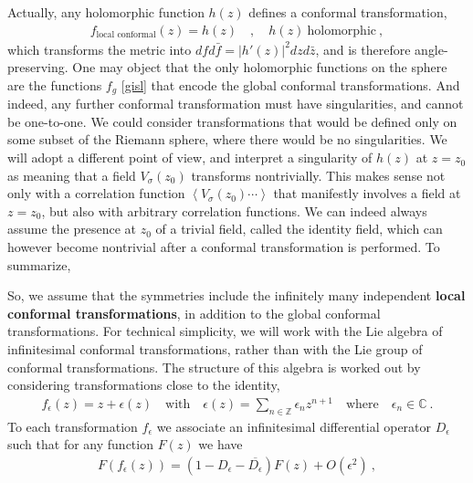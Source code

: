 \documentclass[12pt, a4paper, notitlepage, twoside]{report}
\numberwithin{equation}{section}
\theoremstyle{break}
\begin{document}
Actually, any holomorphic function $h(z)$ defines a conformal transformation,
\begin{align}
 f_\text{local conformal}(z) = h(z) \quad , \quad h(z)\ \text{holomorphic}\ , 
\label{flc}
\end{align}
which transforms the metric into $dfd\bar{f} = |h'(z)|^2 dzd\bar{z}$, and is therefore angle-preserving.
One may object that the only holomorphic functions on the sphere are the functions $f_g$ \eqref{gisl} that encode the global conformal transformations.
And indeed, any further conformal transformation must have singularities, and cannot be one-to-one.
We could consider transformations that would be defined only on some subset of the Riemann sphere, where there would be no singularities.
We will adopt a different point of view, and interpret a singularity of $h(z)$ at $z=z_0$ as meaning that a field $V_\sigma(z_0)$ transforms nontrivially.
This makes sense not only with a correlation function $\left\langle V_{\sigma}(z_0)\cdots \right\rangle $ that manifestly involves a field at $z=z_0$, 
but also with arbitrary correlation functions.
We can indeed always assume the presence at $z_0$ of a trivial field, called the identity field, which can however become nontrivial after a conformal transformation is performed.
To summarize,
\begin{center}
\end{center}
So, we assume that the symmetries include the infinitely many independent \textbf{\boldmath local conformal transformations}, in addition to the global conformal transformations.
For technical simplicity, we will work with the Lie algebra of infinitesimal conformal transformations, rather than with the Lie group of conformal transformations.
The structure of this algebra is worked out by considering transformations close to the identity, 
\begin{align}
 f_{\epsilon}(z) = z + \epsilon(z) \quad \text{with} \quad \epsilon(z) = \sum_{n\in{\mathbb{Z}}} \epsilon_n z^{n+1} \quad 
 \text{where} \quad \epsilon_n\in\mathbb{C}\ .
\label{sen}
\end{align}
To each transformation $f_\epsilon$ we associate an infinitesimal differential operator $D_\epsilon$ such that for any function $F(z)$ we have 
\begin{align}
 F(f_\epsilon(z)) = \left(1- D_\epsilon -\overline{D_\epsilon} \right)F(z) + O(\epsilon^2)\ ,
\label{ffe}
\end{align}
\end{document}
